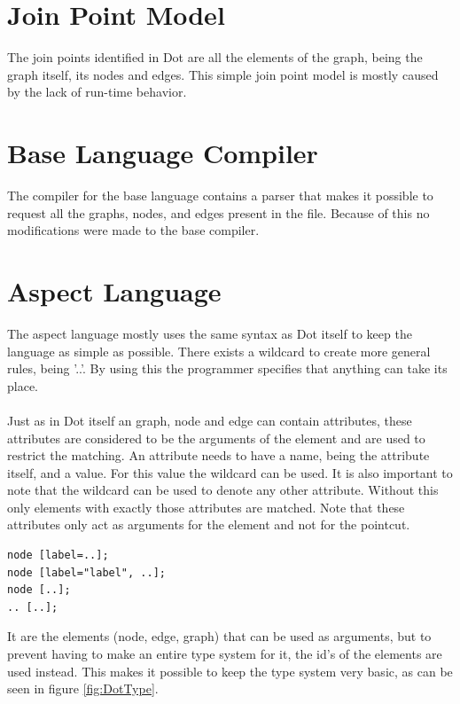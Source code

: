 \documentclass[a4paper]{report}
\begin{document}
\section{Join Point Model}
The join points identified in Dot are all the elements of the graph, being the graph itself, its nodes and edges. This simple join point model is mostly caused by the lack of run-time behavior.

\section{Base Language Compiler}
The compiler for the base language contains a parser that makes it possible to request all the graphs, nodes, and edges present in the file. Because of this no modifications were made to the base compiler.

\section{Aspect Language}
The aspect language mostly uses the same syntax as Dot itself to keep the language as simple as possible. There exists a wildcard to create more general rules, being '..'. By using this the programmer specifies that anything can take its place.\\
\\
Just as in Dot itself an graph, node and edge can contain attributes, these attributes are considered to be the arguments of the element and are used to restrict the matching. An attribute needs to have a name, being the attribute itself, and a value. For this value the wildcard can be used. It is also important to note that the wildcard can be used to denote any other attribute. Without this only elements with exactly those attributes are matched. Note that these attributes only act as arguments for the element and not for the pointcut.
\begin{lstlisting}[multicols=2,caption=Examples of using the wildcard.,label=lst:Dot_Wildcard]
node [label=..];
node [label="label", ..];
node [..];
.. [..];
\end{lstlisting}
It are the elements (node, edge, graph) that can be used as arguments, but to prevent having to make an entire type system for it, the id's of the elements are used instead. This makes it possible to keep the type system very basic, as can be seen in figure \ref{fig:DotType}.
\end{document}
